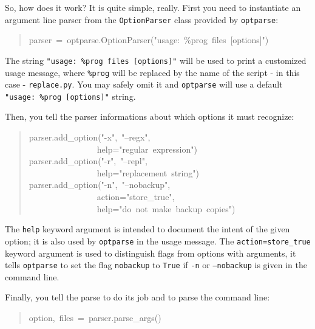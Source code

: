 \documentclass[10pt,english]{article}
\begin{document}
So, how does it work? It is quite simple, really. 
First you need to instantiate an argument line parser from
the \texttt{OptionParser} class provided by \texttt{optparse}:
\begin{quote}
\begin{ttfamily}\begin{flushleft}
\mbox{parser~=~optparse.OptionParser("usage:~{\%}prog~files~[options]")}
\end{flushleft}\end{ttfamily}
\end{quote}

The string \texttt{"usage: {\%}prog files [options]"} will be used to
print a customized usage message,  where \texttt{{\%}prog} will be replaced
by the name of the script - in this case - \texttt{replace.py}. You
may safely omit it and \texttt{optparse} will use a default 
\texttt{"usage: {\%}prog [options]"} string.

Then, you tell the parser informations about which options
it must recognize:
\begin{quote}
\begin{ttfamily}\begin{flushleft}
\mbox{parser.add{\_}option("-x",~"--regx",}\\
\mbox{~~~~~~~~~~~~~~~~help="regular~expression")}\\
\mbox{parser.add{\_}option("-r",~"--repl",}\\
\mbox{~~~~~~~~~~~~~~~~help="replacement~string")}\\
\mbox{parser.add{\_}option("-n",~"--nobackup",}\\
\mbox{~~~~~~~~~~~~~~~~action="store{\_}true",}\\
\mbox{~~~~~~~~~~~~~~~~help="do~not~make~backup~copies")}
\end{flushleft}\end{ttfamily}
\end{quote}

The \texttt{help} keyword argument is intended to document the
intent of the given option; it is also used by \texttt{optparse} in the 
usage message. The \texttt{action=store{\_}true} keyword argument is
used to distinguish flags from options with arguments, it tells
\texttt{optparse} to set the flag \texttt{nobackup} to \texttt{True} if \texttt{-n}
or \texttt{--nobackup} is given in the command line.

Finally, you tell the parse to do its job and to parse the command line:
\begin{quote}
\begin{ttfamily}\begin{flushleft}
\mbox{option,~files~=~parser.parse{\_}args()}
\end{flushleft}\end{ttfamily}
\end{quote}
\end{document}
